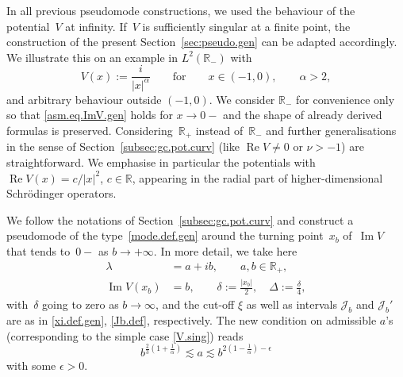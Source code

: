\begin{Example}\label{ex:sing}
In all previous pseudomode constructions, 
we used the behaviour of the potential~$V$ at infinity. 
If~$V$ is sufficiently singular at a finite point, 
the construction of the present Section~\ref{sec:pseudo.gen} 
can be adapted accordingly.
We illustrate this on an example in $L^2({\mathbb{R}}_-)$ with
\begin{equation}\label{V.sing}
  V(x) := \frac{i}{|x|^\alpha}
  \qquad \text{for} \qquad x\in (-1,0), 
  \qquad \alpha >2, 
\end{equation}
and arbitrary behaviour outside $(-1,0)$. We consider ${\mathbb{R}}_-$ for convenience only so that \eqref{asm.eq.ImV.gen} holds  for $x \to 0-$ and the shape of already derived formulas is preserved.
Considering~${\mathbb{R}}_+$ instead of~${\mathbb{R}}_-$ and
further generalisations 
in the sense of Section~\ref{subsec:gc.pot.curv}
(like ${\operatorname{Re}} V \neq 0$ or $\nu > -1$) 
are straightforward. 
We emphasise in particular the potentials with 
${\operatorname{Re}} V(x)=c/|x|^2$, $c \in{\mathbb{R}}$, 
appearing in the radial part of 
higher-dimensional Schr\"odinger operators.

We follow the notations of Section~\ref{subsec:gc.pot.curv} 
and construct a pseudomode of the type~\eqref{mode.def.gen} 
around the turning point~$x_b$ of~${\operatorname{Im}} V$
that tends to~$0-$ as $b \to +\infty$.  
In more detail, we take here
\begin{equation}
\begin{aligned}
\lambda &= a + ib, \qquad a,b \in {\mathbb{R}}_+,
\\
{\operatorname{Im}} V(x_b)&=b, 
\qquad \delta:=\frac{|x_b|}{2}, 
\quad \Delta:= \frac \delta 4,
\end{aligned}
\end{equation}
with~$\delta$ going to zero as $b\to\infty$,
and the cut-off $\xi$  as well as intervals ${\mathcal J}_b$ and ${\mathcal J}_b'$ are as in \eqref{xi.def.gen}, \eqref{Jb.def}, respectively. The new condition on admissible $a$'s 
(corresponding to the simple case \eqref{V.sing}) reads
\begin{equation}\label{a.gen.sing}
b^{\frac 23(1+\frac 1\alpha)} {\lesssim} a  {\lesssim} b^{2(1-\frac 1\alpha)-\epsilon}
\end{equation}
with some $\epsilon>0$.


\end{Example}
